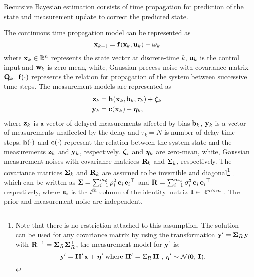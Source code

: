 Recursive Bayesian estimation consists of time propagation for prediction of the state and measurement update to correct the predicted state.

The continuous time propagation model can be represented as
\begin{equation}
	\label{eqn:StateProp}
	\mathbf{x}_{k+1} = \mathbf{f} (\mathbf{x}_k, \mathbf{u}_k ) + \boldsymbol{\omega}_k
\end{equation}
where $\mathbf{x}_k \in\mathbb{R}^n$ represents the state vector at discrete-time $k$, $\mathbf{u}_k$ is the control input and $\mathbf{w}_k$ is zero-mean, white, Gaussian process noise with covariance matrix $\mathbf{Q}_k$. $\mathbf{f} (\cdot)$ represents the relation for propagation of the system between successive time steps.
The measurement models are represented as
\begin{align} 
	\label{eqn:DelayedMeasurement}
	\mathbf{z}_k &= \mathbf{h} ( \mathbf{x}_{k}, \mathbf{b}_{k}, \tau_k ) + \boldsymbol{\zeta}_k \\
	\label{eqn:UndelayedMeasurement}
	\mathbf{y}_k &= \mathbf{c} ( \mathbf{x}_k ) + \boldsymbol{\eta}_k,
\end{align}
where $\mathbf{z}_k$ is a vector of delayed measurements affected by bias $\mathbf{b}_k$, $\mathbf{y}_k$ is a vector of measurements unaffected by the delay and $\tau_k = N$ is number of delay time steps.
$\mathbf{h}(\cdot)$ and $\mathbf{c}(\cdot)$ represent the relation between the system state and the measurements $\mathbf{z}_k$ and $\mathbf{y}_k$, respectively.
$\boldsymbol{\zeta}_k$ and $\boldsymbol{\eta}_k$ are zero-mean, white, Gaussian measurement noises with covariance matrices $\mathbf{R}_k$ and $\boldsymbol{\Sigma}_k$, respectively.
The covariance matrices $\boldsymbol{\Sigma}_k$ and $\mathbf{R}_k$ are assumed to be invertible and diagonal\footnote
{\label{ftnt:R_assumption}
	Note that there is no restriction attached to this assumption. The solution can be used for any  covariance matrix by using the transformation $\mathbf{y}' =\boldsymbol{\Sigma}_R  \, \mathbf{y}$ with $\mathbf{R}^{-1} = \boldsymbol{\Sigma}_R \, \boldsymbol{\Sigma}_R^\top$, the measurement model for $\mathbf{y}'$ is:
	$$\mathbf{y}'=\mathbf{H}' \,\mathbf{x}+\boldsymbol{\eta}' \mbox{ where } \mathbf{H}' = \Sigma_R  \, \mathbf{H} \mbox{ , } \boldsymbol{\eta}' \sim \mathcal{N}(\boldsymbol{0},\,\mathbf{I}).$$
}
, which can be written as $\boldsymbol{\Sigma} = \sum_{i=1}^{m_d} \rho_{i}^2 \, \mathbf{e}_i  \,{\mathbf{e}_i}^\top$ and $\mathbf{R} = \sum_{i=1}^{m_u} \sigma_{i}^2 \, \mathbf{e}_i  \,{\mathbf{e}_i}^\top$, respectively, where $\mathbf{e}_i$ is the $i^{th}$ column of the identity matrix $\mathbf{I} \in \mathbb{R}^{m \times m}$ .
The prior and measurement noise are independent.

